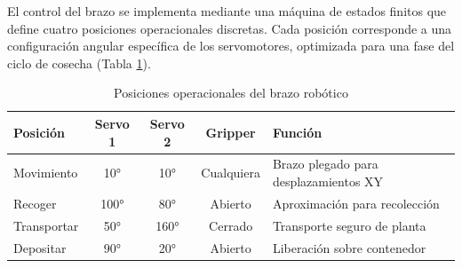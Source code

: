 El control del brazo se implementa mediante una máquina de estados finitos que define cuatro posiciones operacionales discretas. Cada posición corresponde a una configuración angular específica de los servomotores, optimizada para una fase del ciclo de cosecha (Tabla \ref{tab:estados_brazo}).

\begin{table}[H]
\centering
\small
\begin{tabular}{|l|c|c|c|p{4.5cm}|}
\hline
\textbf{Posición} & \textbf{Servo 1} & \textbf{Servo 2} & \textbf{Gripper} & \textbf{Función} \\
\hline
Movimiento & 10° & 10° & Cualquiera & Brazo plegado para desplazamientos XY \\
\hline
Recoger & 100° & 80° & Abierto & Aproximación para recolección \\
\hline
Transportar & 50° & 160° & Cerrado & Transporte seguro de planta \\
\hline
Depositar & 90° & 20° & Abierto & Liberación sobre contenedor \\
\hline
\end{tabular}
\caption{Posiciones operacionales del brazo robótico}
\label{tab:estados_brazo}
\end{table}

